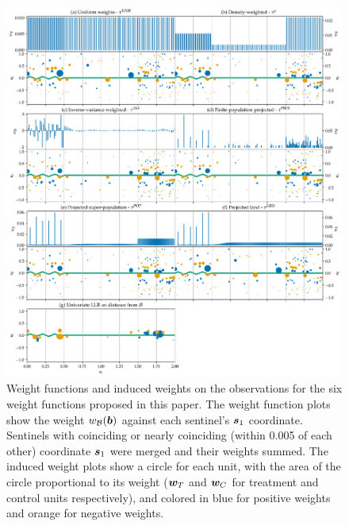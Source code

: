 \begin{figure}[ptb]
\centering
\includegraphics[width=\textwidth]{figures/weight_functions.png}
\caption{
	\label{fig:weight_functions}
	Weight functions and induced weights on the observations for the six weight functions proposed in this paper. The weight function plots show the weight \(w_{\mathcal{B}}(\bm{b})\) against each sentinel's \(\bm{s}_1\) coordinate. Sentinels with coinciding or nearly coinciding (within 0.005 of each other) coordinate \(\bm{s}_1\) were merged and their weights summed. The induced weight plots show a circle for each unit, with the area of the circle proportional to its weight (\(\bm{w}_{T}\) and \(\bm{w}_{C}\) for treatment and control units respectively), and colored in blue for positive weights and orange for negative weights.}
\end{figure}

